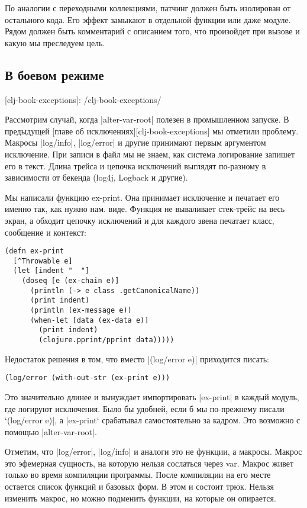 По аналогии с переходными коллекциями, патчинг должен быть изолирован от
остального кода. Его эффект замыкают в отдельной функции или даже модуле. Рядом
должен быть комментарий с описанием того, что произойдет при вызове и какую мы
преследуем цель.

\subsection{В боевом режиме}

[clj-book-exceptions]: /clj-book-exceptions/

Рассмотрим случай, когда \spverb|alter-var-root| полезен в промышленном запуске. В
предыдущей [главе об исключениях][clj-book-exceptions] мы отметили
проблему. Макросы \spverb|log/info|, \spverb|log/error| и другие принимают первым аргументом
исключение. При записи в файл мы не знаем, как система логирование запишет его в
текст. Длина трейса и цепочка исключений выглядят по-разному в зависимости от
бекенда (log4j, Logback и другие).

Мы написали функцию ex-print. Она принимает исключение и печатает его именно
так, как нужно нам. виде. Функция не вываливает стек-трейс на весь экран, а
обходит цепочку исключений и для каждого звена печатает класс, сообщение и
контекст:

\begin{verbatim}
(defn ex-print
  [^Throwable e]
  (let [indent "  "]
    (doseq [e (ex-chain e)]
      (println (-> e class .getCanonicalName))
      (print indent)
      (println (ex-message e))
      (when-let [data (ex-data e)]
        (print indent)
        (clojure.pprint/pprint data)))))
\end{verbatim}

Недостаток решения в том, что вместо \spverb|(log/error e)| приходится писать:

\begin{verbatim}
(log/error (with-out-str (ex-print e)))
\end{verbatim}

Это значительно длинее и вынуждает импортировать \spverb|ex-print| в каждый модуль, где
логируют исключения. Было бы удобней, если б мы по-прежнему писали `(log/error
e)\spverb|, а |ex-print` срабатывал самостоятельно за кадром. Это возможно с помощью
\spverb|alter-var-root|.

Отметим, что \spverb|log/error|, \spverb|log/info| и аналоги это не функции, а макросы. Макрос
это эфемерная сущность, на которую нельзя сослаться через var. Макрос живет
только во время компиляции программы. После компиляции на его месте остается
список функций и базовых форм. В этом и состоит трюк. Нельзя изменить макрос, но
можно подменить функции, на которые он опирается.

